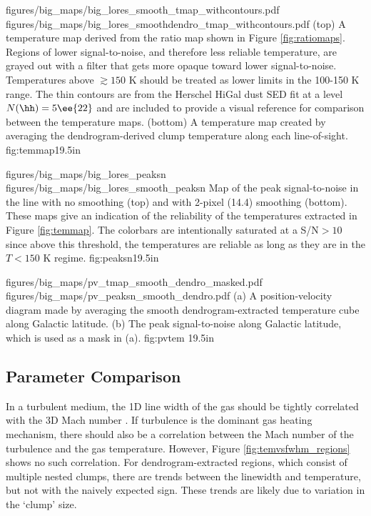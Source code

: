 \RotFigureTwoAA
{figures/big_maps/big_lores_smooth_tmap_withcontours.pdf}
{figures/big_maps/big_lores_smoothdendro_tmap_withcontours.pdf}
{(top) A temperature map derived from the \Rone ratio map shown
in Figure \ref{fig:ratiomaps}.  Regions of lower signal-to-noise, and therefore less
reliable temperature, are grayed out with a filter that gets more opaque
toward lower signal-to-noise.  Temperatures above $\gtrsim150$ K should be
treated as lower limits in the 100-150 K range.
The thin contours are from the Herschel HiGal dust SED fit at a level $N(\hh)=5\ee{22}$
and are included to provide a visual reference for comparison between the temperature
maps.
(bottom) A temperature map created by averaging the dendrogram-derived clump temperature
along each line-of-sight.
}
{fig:temmap}{1}{9.5in}

\RotFigureTwoAA
{figures/big_maps/big_lores_peaksn}
{figures/big_maps/big_lores_smooth_peaksn}
{Map of the peak signal-to-noise in the \para \threeohthree line with no
smoothing (top) and with 2-pixel (14.4\arcsec) smoothing (bottom).  
These maps give an indication of the reliability of the temperatures extracted
in Figure \ref{fig:temmap}.  The colorbars are intentionally saturated at a
S/N$>10$ since above this threshold, the temperatures are reliable as long as
they are in the $T<150$ K regime.
}
{fig:peaksn}{1}{9.5in}



\RotFigureTwoAA
{figures/big_maps/pv_tmap_smooth_dendro_masked.pdf}
{figures/big_maps/pv_peaksn_smooth_dendro.pdf}
{(a) A position-velocity diagram made by averaging the smooth
dendrogram-extracted temperature cube along Galactic latitude.  (b) The peak
signal-to-noise along Galactic latitude, which is used as a mask in (a).}
{fig:pvtem}
{1}{9.5in}

\subsection{Parameter Comparison}
In a turbulent medium, the 1D line width of the gas should be tightly
correlated with the 3D Mach number \citep[e.g.][]{Federrath2011a}.  If
turbulence is the dominant gas heating mechanism, there should also be a
correlation between the Mach number of the turbulence and the gas temperature.
However, Figure \ref{fig:temvsfwhm_regions} shows no such correlation.  For
dendrogram-extracted regions, which consist of multiple nested clumps, there
are trends between the linewidth and temperature, but not with the naively
expected sign.  These trends are likely due to variation in the `clump' size.

